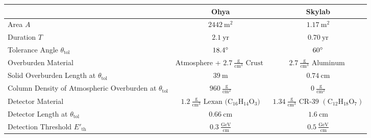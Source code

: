 \documentclass[12pt]{article}
\begin{document}
\begin{figure} 
    \centering
    \renewcommand{\arraystretch}{1.3}
    \begin{tabular}{l|c|c}  
        \centering

         & \textbf{Ohya} & \textbf{Skylab} \\
        \hline
        Area $A$ & $2442\: \text{m}^2$ & $1.17\:\text{m}^2$ \\
        \hline
        Duration $T$ & $2.1\: \text{yr}$ & $0.70\: \text{yr}$ \\
        \hline
        Tolerance Angle $\theta_{\mathrm{tol}}$ & $18.4\degree$ & $60\degree$ \\
        \hline
        Overburden Material & Atmosphere + $2.7\: \frac{ \text{g}}{\text{cm}^{3}} \text{ Crust }$  &$2.7 \:\frac{ \text{g}}{\text{cm}^{3}} \text{ Aluminum }$ \\
        \hline
        Solid Overburden Length at $\theta_{\mathrm{tol}}$ & $39 \:\text{m}$ & $0.74\: \text{cm}$ \\
        \hline
        \makecell[l]{Column Density of \\Atmospheric Overburden at $\theta_{\mathrm{tol}}$}  & $960\:\frac{\text{g}}{\text{cm}^2}$ & $0\:\frac{\text{g}}{\text{cm}^2}$ \\
        \hline
        Detector Material & $1.2\:\frac{ \text{g}}{\text{cm}^{3}} \text{ Lexan } \mathrm{(C_{16}H_{14}O_3})$ &$1.34  \:\frac{ \text{g}}{\text{cm}^{3}} \text{ CR-39 } \mathrm{(C_{12}H_{18}O_7)}$
 \\
        \hline
        Detector Length at $\theta_{\mathrm{tol}}$ & $0.66 \:\text{cm}$ &  $1.6 \:\text{cm}$ \\
        \hline
        Detection Threshold $ E'_{\mathrm{th}}$ & $0.3 \:\frac{ \text{GeV}}{\text{cm}}$ &$0.5  \:\frac{ \text{GeV}}{\text{cm}}$
    \end{tabular}

     \label{tab:params}
\end{figure}
\end{document}
